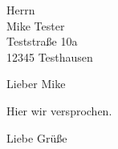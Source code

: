 \documentclass[
    pagenumber=botright,
    parskip=half,
    fontsize=12pt,
    fromalign=right,
    fromrule=false,
    foldmarks=true
    ]{scrlttr2}
\begin{document}
\begin{letter}{%
Herrn\\
Mike Tester\\
Teststraße 10a\\
12345 Testhausen}
\opening{Lieber Mike}

Hier wir versprochen.

\closing{Liebe Grüße}

\end{letter}
\end{document}
